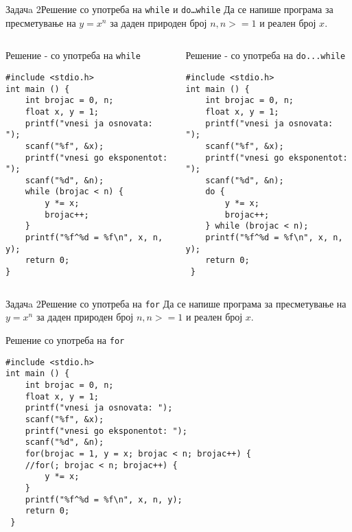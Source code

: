 \begin{frame}[fragile]{Задачa 2}{Решение со употреба на \texttt{while} и
\texttt{do\ldots while}} Да се напише програма за пресметување на $y = x^n$ за
даден природен број $n, n>=1$ и реален број $x$.
\pause
\begin{columns}
\begin{exampleblock}{Решение - со употреба на \texttt{while}}
\begin{lstlisting}
#include <stdio.h> 
int main () { 
    int brojac = 0, n; 
    float x, y = 1; 
    printf("vnesi ja osnovata: "); 
    scanf("%f", &x); 
    printf("vnesi go eksponentot: "); 
    scanf("%d", &n);    
    while (brojac < n) { 
        y *= x; 
        brojac++; 
    } 
    printf("%f^%d = %f\n", x, n, y); 
    return 0; 
}
\end{lstlisting}
\end{exampleblock}
\pause
{}
\begin{exampleblock}{Решение - со употреба на \texttt{do...while}}
\begin{lstlisting}
#include <stdio.h> 
int main () { 
    int brojac = 0, n; 
    float x, y = 1; 
    printf("vnesi ja osnovata: "); 
    scanf("%f", &x); 
    printf("vnesi go eksponentot: "); 
    scanf("%d", &n); 
    do { 
        y *= x; 
        brojac++; 
    } while (brojac < n); 
    printf("%f^%d = %f\n", x, n, y); 
    return 0; 
 }
\end{lstlisting}
\end{exampleblock}
\end{columns}
\end{frame}

\begin{frame}[fragile]{Задачa 2}{Решение со употреба на \texttt{for}}
Да се напише програма за пресметување на $y = x^n$ за даден природен број $n,
n>=1$ и реален број $x$.
\pause
\begin{exampleblock}{Решение со употреба на \texttt{for}}
\begin{lstlisting}
#include <stdio.h> 
int main () { 
    int brojac = 0, n; 
    float x, y = 1; 
    printf("vnesi ja osnovata: "); 
    scanf("%f", &x); 
    printf("vnesi go eksponentot: "); 
    scanf("%d", &n); 
    for(brojac = 1, y = x; brojac < n; brojac++) {
    //for(; brojac < n; brojac++) {
    	y *= x;
    } 
    printf("%f^%d = %f\n", x, n, y); 
    return 0; 
 }
\end{lstlisting}
\end{exampleblock}
\end{frame}



